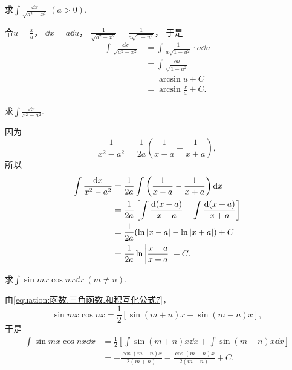 \begin{example}
求\(\int \frac{\dd{x}}{\sqrt{a^2-x^2}}\ (a>0)\).
\begin{solution}
令\(u=\frac{x}{a}\)，
\(\dd{x}=a\dd{u}\)，
\(\frac{1}{\sqrt{a^2-x^2}}
= \frac{1}{a\sqrt{1-u^2}}\)，
于是\begin{align}
	\int \frac{\dd{x}}{\sqrt{a^2-x^2}}
	&= \int \frac{1}{a\sqrt{1-u^2}} \cdot a\dd{u}
		\nonumber \\
	&= \int \frac{\dd{u}}{\sqrt{1-u^2}}
		\nonumber \\
	&= \arcsin u + C
		\nonumber \\
	&= \arcsin\frac{x}{a} + C.
\end{align}
\end{solution}
\end{example}

\begin{example}
求\(\int \frac{\dd{x}}{x^2 - a^2}\).
\begin{solution}
因为\begin{equation*}
	\frac{1}{x^2 - a^2}
	= \frac{1}{2a} \left(\frac{1}{x-a} - \frac{1}{x+a}\right),
\end{equation*}
所以\begin{align}
	\int \frac{\dd{x}}{x^2 - a^2}
	&= \frac{1}{2a} \int \left(\frac{1}{x-a} - \frac{1}{x+a}\right) \dd{x}
		\nonumber \\
	&= \frac{1}{2a} \left[ \int \frac{\dd(x-a)}{x-a} - \int \frac{\dd(x+a)}{x+a} \right]
		\nonumber \\
	&= \frac{1}{2a} ( \ln\abs{x-a} - \ln\abs{x+a} ) + C
		\nonumber \\
	&= \frac{1}{2a} \ln\abs{\frac{x-a}{x+a}} + C.
\end{align}
\end{solution}
\end{example}

\begin{example}
求\(\int \sin mx \cos nx \dd{x}\ (m \neq n)\).
\begin{solution}
由\cref{equation:函数.三角函数.和积互化公式7}，
\begin{equation*}
	\sin mx \cos nx
	= \frac12 [\sin(m+n)x + \sin(m-n)x],
\end{equation*}
于是\begin{align}
	\int \sin mx \cos nx \dd{x}
	&= \frac12 \left[
		\int \sin(m+n)x \dd{x}
		+ \int \sin(m-n)x \dd{x}
	\right]
	\nonumber \\
	&= -\frac{\cos(m+n)x}{2(m+n)}
		- \frac{\cos(m-n)x}{2(m-n)}
		+ C.
\end{align}
\end{solution}
\end{example}

